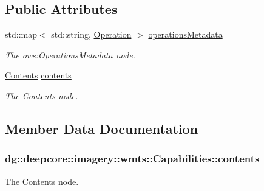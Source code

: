 \subsection*{Public Attributes}
\begin{DoxyCompactItemize}
\item 
std\+::map$<$ std\+::string, \hyperlink{structdg_1_1deepcore_1_1imagery_1_1wmts_1_1_operation}{Operation} $>$ \hyperlink{structdg_1_1deepcore_1_1imagery_1_1wmts_1_1_capabilities_a8f1483625c85a9ecebec0093ddfc6103}{operations\+Metadata}
\begin{DoxyCompactList}\small\item\em The ows\+:Operations\+Metadata node. \end{DoxyCompactList}\item 
\hyperlink{structdg_1_1deepcore_1_1imagery_1_1wmts_1_1_contents}{Contents} \hyperlink{structdg_1_1deepcore_1_1imagery_1_1wmts_1_1_capabilities_a0f74f0847b9299ec63d808edb74b1296}{contents}
\begin{DoxyCompactList}\small\item\em The \hyperlink{structdg_1_1deepcore_1_1imagery_1_1wmts_1_1_contents}{Contents} node. \end{DoxyCompactList}\end{DoxyCompactItemize}


\subsection{Member Data Documentation}
\subsubsection[{\texorpdfstring{contents}{contents}}]{ dg\+::deepcore\+::imagery\+::wmts\+::\+Capabilities\+::contents}\hypertarget{structdg_1_1deepcore_1_1imagery_1_1wmts_1_1_capabilities_a0f74f0847b9299ec63d808edb74b1296}{}\label{structdg_1_1deepcore_1_1imagery_1_1wmts_1_1_capabilities_a0f74f0847b9299ec63d808edb74b1296}


The \hyperlink{structdg_1_1deepcore_1_1imagery_1_1wmts_1_1_contents}{Contents} node. 

